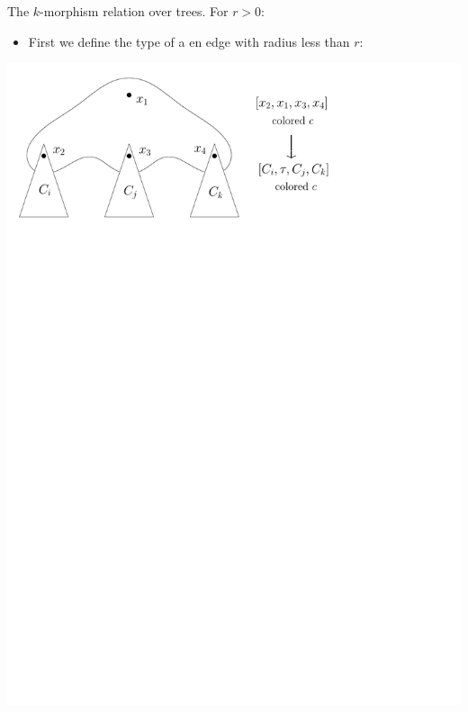 \documentclass[11pt]{beamer}
\begin{document}
	\begin{frame}{The $k$-morphism relation over trees.}
		For $r>0$:
			\begin{itemize}
				\item  First we
				define the type of a en edge with radius less than $r$:
				
			\end{itemize}
		\begin{center}
			\includegraphics[width=0.8\linewidth]{Edgetype.pdf}
		\end{center}
	\end{frame}
\end{document}
